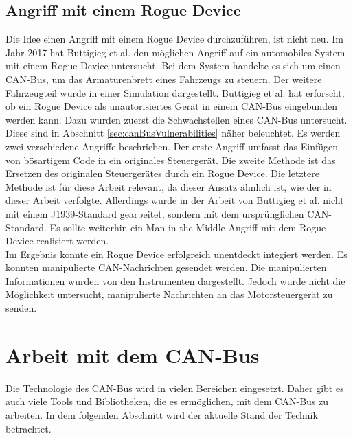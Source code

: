 \subsection{Angriff mit einem Rogue Device}
Die Idee einen Angriff mit einem Rogue Device durchzuführen, ist nicht neu. Im Jahr 2017 hat Buttigieg et al. \cite{Buttigieg2017}
den möglichen Angriff auf ein automobiles System mit einem Rogue Device untersucht. Bei dem System handelte es sich um einen
CAN-Bus, um das Armaturenbrett eines Fahrzeugs zu steuern. Der weitere Fahrzeugteil wurde in einer Simulation dargestellt.
Buttigieg et al. hat erforscht, ob ein Rogue Device als unautorisiertes 
Gerät in einem CAN-Bus eingebunden werden kann. 
Dazu wurden zuerst die Schwachstellen eines CAN-Bus untersucht. Diese
sind in Abschnitt \ref{sec:canBusVulnerabilities} näher beleuchtet. Es werden zwei verschiedene Angriffe beschrieben.
Der erste Angriff umfasst das Einfügen von bösartigem Code in ein originales Steuergerät. Die zweite Methode ist das Ersetzen
des originalen Steuergerätes durch ein Rogue Device. Die letztere Methode ist für diese Arbeit relevant, da dieser Ansatz
ähnlich ist, wie der in dieser Arbeit verfolgte. Allerdings wurde in der Arbeit von Buttigieg et al. nicht mit einem
J1939-Standard gearbeitet, sondern mit dem ursprünglichen CAN-Standard. Es sollte weiterhin ein Man-in-the-Middle-Angriff
mit dem Rogue Device realisiert werden. \\
Im Ergebnis konnte ein Rogue Device erfolgreich unentdeckt integiert werden. Es konnten manipulierte CAN-Nachrichten gesendet werden.
Die manipulierten Informationen wurden von den Instrumenten dargestellt. Jedoch wurde nicht die Möglichkeit untersucht, manipulierte
Nachrichten an das Motorsteuergerät zu senden.


\section{Arbeit mit dem CAN-Bus}
Die Technologie des CAN-Bus wird in vielen Bereichen eingesetzt.
Daher gibt es auch viele Tools und Bibliotheken, die es ermöglichen, mit dem CAN-Bus zu arbeiten.
In dem folgenden Abschnitt wird der aktuelle Stand der Technik betrachtet.

